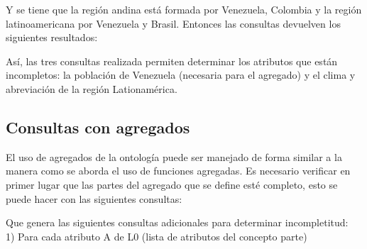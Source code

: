 Y se tiene que la región andina está formada por Venezuela, Colombia y la región latinoamericana por Venezuela y Brasil. Entonces las consultas devuelven los siguientes resultados: \\



Así, las tres consultas realizada permiten determinar los atributos que están incompletos: la población de Venezuela (necesaria para el agregado) y el clima y abreviación de la región Lationamérica. \\

\subsection{Consultas con agregados}

El uso de agregados de la ontología puede ser manejado de forma similar a la manera como se aborda el uso de funciones agregadas. Es necesario verificar en primer lugar que las partes del agregado que se define esté completo, esto se puede hacer con las siguientes consultas: \\


Que genera las siguientes consultas adicionales para determinar incompletitud: \\

1) Para cada atributo A de L0 (lista de atributos del concepto parte) \\


